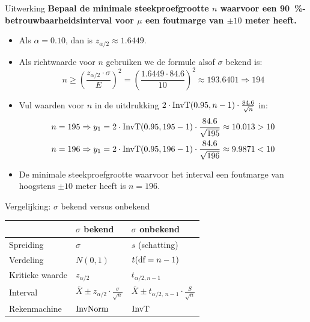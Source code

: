     \begin{frame}{Uitwerking}
        \textbf{Bepaal de minimale steekproefgrootte $n$ waarvoor een \SI{90}{\percent}-betrouwbaarheidsinterval voor $\mu$ een foutmarge van $\pm 10$ meter heeft.}
        \pause\vfill
        {
            \begin{itemize}[<+->]
                \color{highlightcolor}
                \item Als $\alpha = 0.10$, dan is $z_{\alpha/2} \approx 1.6449$.
                \item Als richtwaarde voor $n$ gebruiken we de formule alsof $\sigma$ bekend is:
                \[ n \geq \left( \frac{z_{\alpha/2} \cdot \sigma}{E} \right)^2 = \left( \frac{1.6449 \cdot 84.6}{10} \right)^2 \approx 193.6401 \Rightarrow 194 \]
                \item Vul waarden voor $n$ in de uitdrukking $2 \cdot \operatorname{InvT}(0.95, n-1) \cdot \frac{84.6}{\sqrt{n}}$ in:
                \begin{align*}
                    n = 195 &\Rightarrow y_1 = 2 \cdot \operatorname{InvT}(0.95, 195-1) \cdot \frac{84.6}{\sqrt{195}} \approx 10.013 > 10 \\
                    n = 196 &\Rightarrow y_1 = 2 \cdot \operatorname{InvT}(0.95, 196-1) \cdot \frac{84.6}{\sqrt{196}} \approx 9.9871 < 10
                \end{align*}
                \item De minimale steekproefgrootte waarvoor het interval een foutmarge van hoogstens $\pm 10$ meter heeft is $n = 196$.
            \end{itemize}
        }
    \end{frame}

    \begin{frame}{Vergelijking: $\sigma$ bekend versus onbekend}
        \begin{center}
            \begin{tabular}{lll}
                \toprule
                    & \textbf{$\sigma$ bekend} & \textbf{$\sigma$ onbekend} \\
                \midrule
                    Spreiding         & $\sigma$ & $s$ (schatting) \\
                    Verdeling         & $N(0,1)$ & $t(\text{df}=n-1)$ \\
                    Kritieke waarde   & $z_{\alpha/2}$ & $t_{\alpha/2, n-1}$ \\
                    Interval          & $\overline{X} \pm z_{\alpha/2}\cdot\frac{\sigma}{\sqrt{n}}$ & $\overline{X} \pm t_{\alpha/2,\, n-1}\cdot\frac{S}{\sqrt{n}}$ \\
                    Rekenmachine      & $\operatorname{InvNorm}$ & $\operatorname{InvT}$ \\
                \bottomrule
            \end{tabular}
        \end{center}
    \end{frame}

